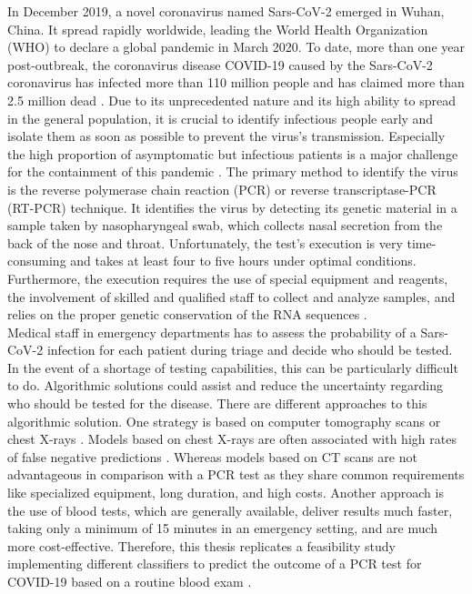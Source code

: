 In December 2019, a novel coronavirus named Sars-CoV-2 emerged in Wuhan, China. 
It spread rapidly worldwide, leading the World Health Organization (WHO) 
to declare a global pandemic in March 2020. To date, more than one year 
post-outbreak, the coronavirus disease COVID-19 caused by the Sars-CoV-2 
coronavirus has infected more than 110 million people and has claimed more than 
2.5 million dead \cite{RN204}. Due to its unprecedented nature and its high 
ability to spread in the general population, it is crucial to identify 
infectious people early and isolate them as soon as possible to 
prevent the virus's transmission. 
Especially the high proportion of asymptomatic but infectious patients is a 
major challenge for the containment of this pandemic \cite{RN205}. The primary 
method to identify the virus is the reverse polymerase chain reaction (PCR) or 
reverse transcriptase-PCR (RT-PCR) technique. It identifies the virus by 
detecting its genetic material in a sample taken by nasopharyngeal swab, which 
collects nasal secretion from the back of the nose and throat. Unfortunately, 
the test's execution is very time-consuming and takes at least four to five 
hours under optimal conditions. 
Furthermore, the execution requires the use of special equipment and reagents, 
the involvement of skilled and qualified staff to collect and analyze samples, 
and relies on the proper genetic conservation of the RNA sequences 
\cite{RN201, RN202}.
\\
Medical staff in emergency departments has to assess the probability of a 
Sars-CoV-2 infection for each patient during triage and decide 
who should be tested. In the event of a shortage of testing capabilities, this 
can be particularly difficult to do. Algorithmic solutions could assist and 
reduce the uncertainty regarding who should be tested for the 
disease. There are different approaches to this algorithmic solution.
One strategy is based on computer tomography scans or chest X-rays 
\cite{RN200}. Models based on chest X-rays are often associated with high rates 
of false negative predictions \cite{RN200, RN206}. Whereas models based on CT 
scans are not advantageous in comparison with a PCR test as they share common 
requirements like specialized equipment, long duration, and high costs.
Another approach is the use of blood tests, which are generally available, 
deliver results much faster, taking only a minimum of 15 minutes in an 
emergency setting, and are much more cost-effective.
Therefore, this thesis replicates a feasibility study implementing different 
classifiers to predict the outcome of a PCR test for COVID-19 based on a 
routine blood exam \cite{RN127}.
